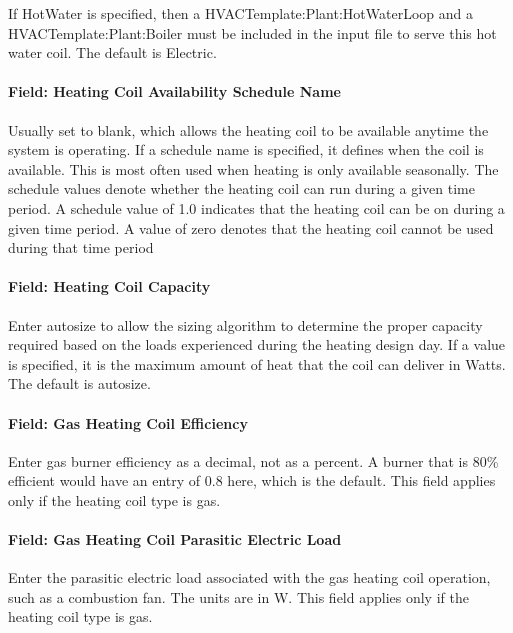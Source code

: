 If HotWater is specified, then a HVACTemplate:Plant:HotWaterLoop and a HVACTemplate:Plant:Boiler must be included in the input file to serve this hot water coil. The default is Electric.

\paragraph{Field: Heating Coil Availability Schedule Name}\label{field-heating-coil-availability-schedule-name-1}

Usually set to blank, which allows the heating coil to be available anytime the system is operating. If a schedule name is specified, it defines when the coil is available. This is most often used when heating is only available seasonally. The schedule values denote whether the heating coil can run during a given time period. A schedule value of 1.0 indicates that the heating coil can be on during a given time period. A value of zero denotes that the heating coil cannot be used during that time period

\paragraph{Field: Heating Coil Capacity}\label{field-heating-coil-capacity}

Enter autosize to allow the sizing algorithm to determine the proper capacity required based on the loads experienced during the heating design day. If a value is specified, it is the maximum amount of heat that the coil can deliver in Watts. The default is autosize.

\paragraph{Field: Gas Heating Coil Efficiency}\label{field-gas-heating-coil-efficiency}

Enter gas burner efficiency as a decimal, not as a percent. A burner that is 80\% efficient would have an entry of 0.8 here, which is the default. This field applies only if the heating coil type is gas.

\paragraph{Field: Gas Heating Coil Parasitic Electric Load}\label{field-gas-heating-coil-parasitic-electric-load}

Enter the parasitic electric load associated with the gas heating coil operation, such as a combustion fan. The units are in W. This field applies only if the heating coil type is gas.


